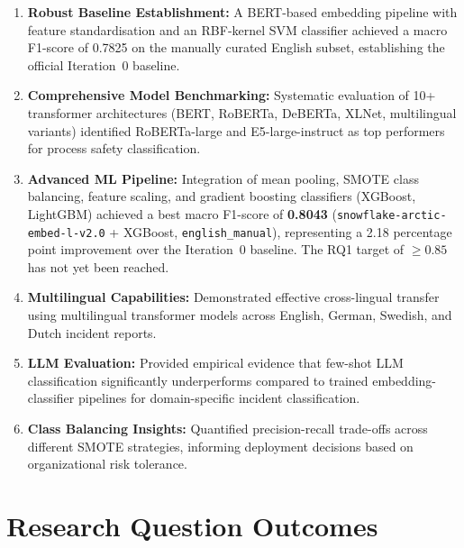\documentclass[11pt, titlepage, bibliography=totoc]{scrreprt}
\begin{document}
\begin{enumerate}
    \item \textbf{Robust Baseline Establishment:} A BERT-based embedding pipeline with feature standardisation and an RBF-kernel SVM classifier achieved a macro F1-score of 0.7825 on the manually curated English subset, establishing the official Iteration~0 baseline.
    
    \item \textbf{Comprehensive Model Benchmarking:} Systematic evaluation of 10+ transformer architectures (BERT, RoBERTa, DeBERTa, XLNet, multilingual variants) identified RoBERTa-large and E5-large-instruct as top performers for process safety classification.
    
    \item \textbf{Advanced ML Pipeline:} Integration of mean pooling, SMOTE class balancing, feature scaling, and gradient boosting classifiers (XGBoost, LightGBM) achieved a best macro F1-score of \textbf{0.8043} (\texttt{snowflake-arctic-embed-l-v2.0} + XGBoost, \texttt{english\_manual}), representing a 2.18 percentage point improvement over the Iteration~0 baseline. The RQ1 target of $\geq 0.85$ has not yet been reached.
    
    \item \textbf{Multilingual Capabilities:} Demonstrated effective cross-lingual transfer using multilingual transformer models across English, German, Swedish, and Dutch incident reports.
    
    \item \textbf{LLM Evaluation:} Provided empirical evidence that few-shot LLM classification significantly underperforms compared to trained embedding-classifier pipelines for domain-specific incident classification.
    
    \item \textbf{Class Balancing Insights:} Quantified precision-recall trade-offs across different SMOTE strategies, informing deployment decisions based on organizational risk tolerance.
\end{enumerate}

\section{Research Question Outcomes}
\end{document}
